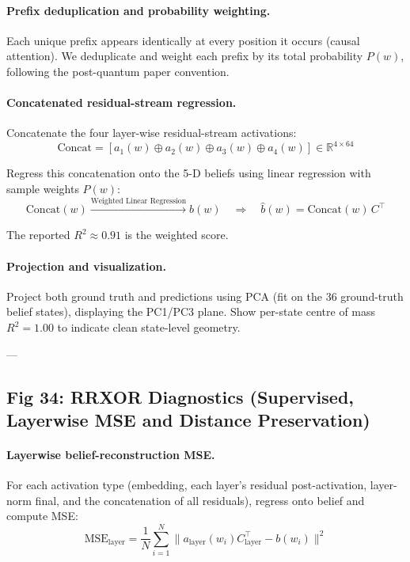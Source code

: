 \documentclass[11pt]{article}
\begin{document}
\paragraph{Prefix deduplication and probability weighting.}
Each unique prefix appears identically at every position it occurs (causal attention). We deduplicate and weight each prefix by its total probability $P(w)$, following the post-quantum paper convention.

\paragraph{Concatenated residual-stream regression.}
Concatenate the four layer-wise residual-stream activations:
\begin{equation}
\text{Concat} = [a_1(w) \oplus a_2(w) \oplus a_3(w) \oplus a_4(w)] \in \mathbb{R}^{4 \times 64}
\end{equation}

Regress this concatenation onto the 5-D beliefs using linear regression with sample weights $P(w)$:
\begin{equation}
\text{Concat}(w) \xrightarrow{\text{Weighted Linear Regression}} b(w)
\quad \Rightarrow \quad \hat{b}(w) = \text{Concat}(w) \, C^{\top}
\end{equation}

The reported $R^2 \approx 0.91$ is the weighted score.

\paragraph{Projection and visualization.}
Project both ground truth and predictions using PCA (fit on the 36 ground-truth belief states), displaying the PC1/PC3 plane. Show per-state centre of mass $R^2 = 1.00$ to indicate clean state-level geometry.

---

\subsection{Fig 34: RRXOR Diagnostics (Supervised, Layerwise MSE and Distance Preservation)}

\paragraph{Layerwise belief-reconstruction MSE.}
For each activation type (embedding, each layer's residual post-activation, layer-norm final, and the concatenation of all residuals), regress onto belief and compute MSE:
\begin{equation}
\text{MSE}_{\text{layer}} = \frac{1}{N} \sum_{i=1}^{N} \| a_{\text{layer}}(w_i) C_{\text{layer}}^{\top} - b(w_i) \|^2
\end{equation}
\end{document}
